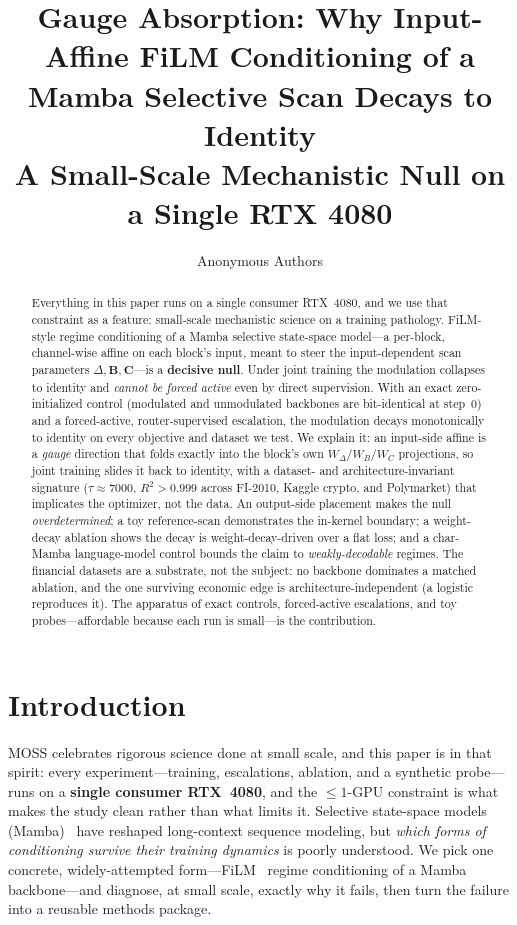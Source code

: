 \documentclass{article}
\title{Gauge Absorption: Why Input-Affine FiLM Conditioning of a Mamba
Selective Scan Decays to Identity\\
\large A Small-Scale Mechanistic Null on a Single RTX 4080}
\author{Anonymous Authors}
\begin{document}
\maketitle

\ifcolmsubmission
\linenumbers
\fi

\begin{abstract}
Everything in this paper runs on a single consumer RTX~4080, and we use that
constraint as a feature: small-scale mechanistic science on a training pathology.
FiLM-style regime conditioning of a Mamba selective state-space model---a
per-block, channel-wise affine on each block's input, meant to steer the
input-dependent scan parameters $\Delta,\mathbf{B},\mathbf{C}$---is a
\textbf{decisive null}. Under joint training the modulation collapses to identity
and \emph{cannot be forced active} even by direct supervision. With an exact
zero-initialized control (modulated and unmodulated backbones are bit-identical at
step~0) and a forced-active, router-supervised escalation, the modulation decays
monotonically to identity on every objective and dataset we test. We explain it:
an input-side affine is a \emph{gauge} direction that folds exactly into the
block's own $W_\Delta/W_B/W_C$ projections, so joint training slides it back to
identity, with a dataset- and architecture-invariant signature
($\tau\approx7000$, $R^2>0.999$ across FI-2010, Kaggle crypto, and Polymarket)
that implicates the optimizer, not the data. An output-side placement makes the
null \emph{overdetermined}; a toy reference-scan demonstrates the in-kernel
boundary; a weight-decay ablation shows the decay is weight-decay-driven over a
flat loss; and a char-Mamba language-model control bounds the claim to
\emph{weakly-decodable} regimes. The financial datasets are a substrate, not the
subject: no backbone dominates a matched ablation, and the one surviving economic
edge is architecture-independent (a logistic reproduces it). The apparatus of exact
controls, forced-active escalations, and toy probes---affordable because each run is
small---is the contribution.
\end{abstract}

\section{Introduction}\label{sec:intro}

MOSS celebrates rigorous science done at small scale, and this paper is in that
spirit: every experiment---training, escalations, ablation, and a synthetic
probe---runs on a \textbf{single consumer RTX~4080}, and the $\le 1$-GPU
constraint is what makes the study clean rather than what limits it. Selective
state-space models (Mamba)~\citep{gu2024mamba} have reshaped long-context
sequence modeling, but \emph{which forms of conditioning survive their training
dynamics} is poorly understood. We pick one concrete, widely-attempted
form---FiLM~\citep{perez2018film} regime conditioning of a Mamba backbone---and
diagnose, at small scale, exactly why it fails, then turn the failure into a
reusable methods package.
\end{document}

